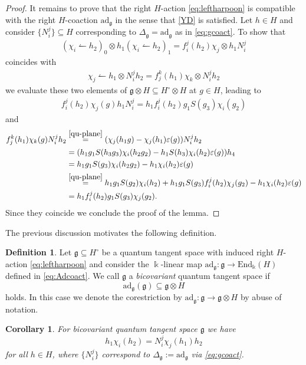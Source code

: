 \documentclass{article}
\newtheorem{corollary}[thm]{Corollary}
\theoremstyle{definition}
\newtheorem{definition}[thm]{Definition}
\begin{document}
\begin{proof}
		It remains to prove that the right $H$-action \eqref{eq:leftharpoon} is compatible with the right $H$-coaction $\mathrm{ad}_\mathfrak{g}$ in the sense that \eqref{YD} is satisfied. Let $h\in H$ and consider $\{N_i^j\}\subseteq H$ corresponding to $\Delta_\mathfrak{g}=\mathrm{ad}_\mathfrak{g}$ as in \eqref{eq:gcoact}. To show that
		\begin{align*}
			(\chi_i\leftharpoonup h_2)_0\otimes h_1(\chi_i\leftharpoonup h_2)_1
			=f_i^j(h_2)\chi_j\otimes h_1N_i^j
		\end{align*}
		coincides with
		\begin{align*}
			\chi_j\leftharpoonup h_1\otimes N_i^jh_2
			=f_j^k(h_1)\chi_k\otimes N_i^jh_2
		\end{align*}
		we evaluate these two elements of $\mathfrak{g}\otimes H\subseteq H^\circ\otimes H$ at $g\in H$, leading to
		\begin{align*}
			f_i^j(h_2)\chi_j(g)h_1N_i^j
			=h_1f_i^j(h_2)g_1S(g_3)\chi_i(g_2)
		\end{align*}
		and
		\begin{align*}
			f_j^k(h_1)\chi_k(g)N_i^jh_2
			&\overset{\eqref{qu-plane}}{=}(\chi_j(h_1g)-\chi_j(h_1)\varepsilon(g))N_i^jh_2\\
			&=(h_1g_1S(h_3g_3)\chi_i(h_2g_2)-h_1S(h_3)\chi_i(h_2)\varepsilon(g))h_4\\
			&=h_1g_1S(g_3)\chi_i(h_2g_2)-h_1\chi_i(h_2)\varepsilon(g)\\
			&\overset{\eqref{qu-plane}}{=}h_1g_1S(g_2)\chi_i(h_2)
			+h_1g_1S(g_3)f_i^j(h_2)\chi_j(g_2)
			-h_1\chi_i(h_2)\varepsilon(g)\\
			&=h_1f_i^j(h_2)g_1S(g_3)\chi_j(g_2).
		\end{align*}
		Since they coincide we conclude the proof of the lemma.
	\end{proof}
	
	The previous discussion motivates the following definition.
	\begin{definition}\label{def:bicovQTS}
		Let $\mathfrak{g}\subseteq H^\circ$ be a quantum tangent space with induced right $H$-action \eqref{eq:leftharpoon} and consider the $\Bbbk$-linear map $\mathrm{ad}_\mathfrak{g}\colon\mathfrak{g}\to\mathrm{End}_\Bbbk(H)$ defined in \eqref{eq:Adcoact}. We call $\mathfrak{g}$ a \textit{bicovariant} quantum tangent space if 
		$$
		\mathrm{ad}_\mathfrak{g}(\mathfrak{g})\subseteq\mathfrak{g}\otimes H
		$$
		holds. In this case we denote the corestriction by $\mathrm{ad}_\mathfrak{g}\colon\mathfrak{g}\to\mathfrak{g}\otimes H$ by abuse of notation.
	\end{definition}
	\begin{corollary}
		For bicovariant quantum tangent space $\mathfrak{g}$ we have
		\begin{equation}\label{eq:N4}
			h_1\chi_i(h_2)=N_i^j\chi_j(h_1)h_2
		\end{equation}
		for all $h\in H$, where $\{N_i^j\}$ correspond to $\Delta_\mathfrak{g}:=\mathrm{ad}_\mathfrak{g}$ via \eqref{eq:gcoact}.
	\end{corollary}
	
\end{document}
